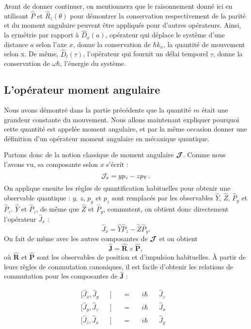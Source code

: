 Avant de donner continuer, on mentionnera que le raisonnement donné ici en utilisant $\hat{P}$ et $\hat{R}_z(\theta)$ pour démontrer la conservation respectivement de la parité et du moment angulaire peuvent être appliqués pour d'autres opérateurs. Ainsi, la symétrie par rapport à $\hat{D}_x(a)$, opérateur qui déplace le système d'une distance $a$ selon l'axe $x$, donne la conservation de $\hbar k_x$, la quantité de mouvement selon x. De même, $\hat{D}_t(\tau)$, l'opérateur qui fournit un délai temporel $\tau$, donne la conservation de $\omega \hbar$, l'énergie du système.

\subsection{L'opérateur moment angulaire}
Nous avons démontré dans la partie précédente que la quantité $m$ était une grandeur constante du mouvement. Nous allons maintenant expliquer pourquoi cette quantité est appelée moment angulaire, et par la même occasion donner une définition d'un opérateur moment angulaire en mécanique quantique.

Partons donc de la notion classique de moment angulaire $\bm{\mathcal{J}}$. Comme nous l'avons vu, sa composante selon $x$ s'écrit :
\begin{equation*}
\mathcal{J}_x=yp_z-zp_Y.
\end{equation*}
On applique ensuite les règles de quantification habituelles pour obtenir une observable quantique : $y$, $z$, $p_y$ et $p_z$ sont remplacés par les observables $\hat{Y}$, $\hat{Z}$, $\hat{P}_y$ et $\hat{P}_z$. $\hat{Y}$ et $\hat{P}_z$, de même que $\hat{Z}$ et $\hat{P}_y$, commutent, on obtient donc directement l'opérateur $\hat{J}_x$ :
\begin{equation*}
\hat{J}_x=\hat{Y}\hat{P}_z-\hat{Z}\hat{P}_y.
\end{equation*}
On fait de même avec les autres composantes de $\bm{\mathcal{J}}$ et on obtient 
\begin{equation*}
\bm{\hat{J}}=\bm{\hat{R}}\times\bm{\hat{P}},
\end{equation*}
où $\bm{\hat{R}}$ et $\bm{\hat{P}}$ sont les observables de position et d'impulsion habituelles. \`A partir de leurs règles de commutation canoniques, il est facile d'obtenir les relations de commutation pour les composantes de $\bm{\hat{J}}$ :

\begin{equation}
\begin{alignedat}{6}
&[\hat{J}_x,\hat{J}_y&&]~&&=~&&i\hbar &&\hat{J}_z&&\\
&[\hat{J}_y,\hat{J}_z&&]~&&=~&&i\hbar &&\hat{J}_x&&\\
&[\hat{J}_z,\hat{J}_x&&]~&&=~&&i\hbar &&\hat{J}_y&&
\end{alignedat}
\label{Eq.CommutJ}
\end{equation}

